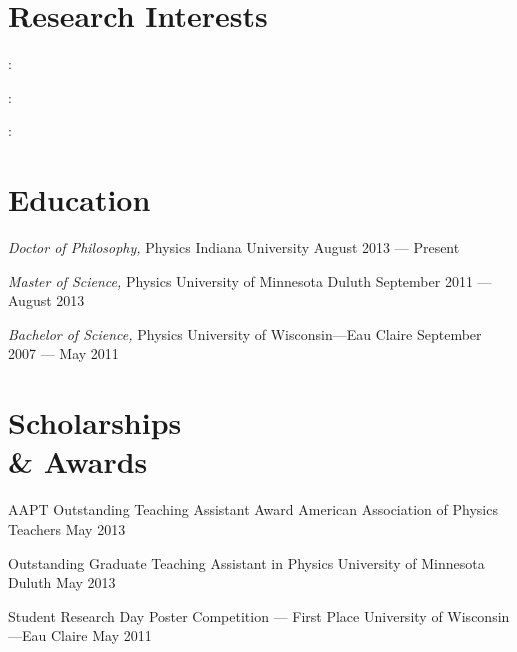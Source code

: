 \documentclass{cv}
\begin{document}
\begin{resume}



\section{Research Interests}

 : 
\itemSep

 : 
\itemSep

 : 



\section{Education}



\object																		
{\emph{Doctor of Philosophy,} Physics}										
{\rm Indiana University}														
{August 2013 --- Present}


\object																		
{\emph{Master of Science,} Physics}											
{\rm University of Minnesota Duluth}											
{September 2011 --- August 2013}	


\object
{\emph{Bachelor of Science,} Physics}											
{\rm University of Wisconsin---Eau Claire}									
{September 2007 --- May 2011}



\section{Scholarships \\ \& Awards}



\object
{AAPT Outstanding Teaching Assistant Award}
{American Association of Physics Teachers}
{May 2013}


\object
{Outstanding Graduate Teaching Assistant in Physics}
{University of Minnesota Duluth}
{May 2013}


\object
{Student Research Day Poster Competition --- First Place}
{University of Wisconsin---Eau Claire}
{May 2011}



\end{resume}
\end{document}
